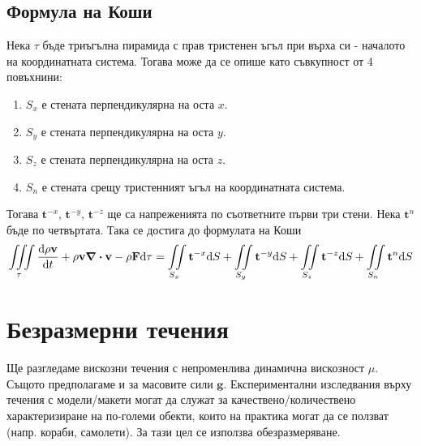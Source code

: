 \documentclass[bulgarian, 12pt]{article}
\begin{document}
\subsection{Формула на Коши}
Нека $\tau$ бъде триъгълна пирамида с прав тристенен ъгъл при върха си - началото на координатната система.
Тогава може да се опише като съвкупност от 4 повъхнини:
\begin{enumerate}
	\item $S_x$ е стената перпендикулярна на оста $x$.
	\item $S_y$ е стената перпендикулярна на оста $y$.
	\item $S_z$ е стената перпендикулярна на оста $z$.
	\item $S_n$ е стената срещу тристенният ъгъл на координатната система.
\end{enumerate}
Тогава $\mathbf{t}^{-x}$, $\mathbf{t}^{-y}$, $\mathbf{t}^{-z}$ ще са напреженията по съответните първи три стени.
Нека $\mathbf{t}^{n}$ бъде по четвъртата. Така се достига до формулата на Коши
\begin{equation}
	\iiint\limits_{\tau} \dv{\rho \mathbf{v}}{t} + \rho \mathbf{v} \div \mathbf{v} - \rho \mathbf{F} \dd \tau =
	\iint\limits_{S_x} \mathbf{t}^{-x} \dd S + \iint\limits_{S_y} \mathbf{t}^{-y} \dd S + \iint\limits_{S_z} \mathbf{t}^{-z} \dd S + \iint\limits_{S_n} \mathbf{t}^{n} \dd S
\end{equation}


\section{Безразмерни течения}
Ще разгледаме вискозни течения с непроменлива динамична вискозност $\mu$.
Същото предполагаме и за масовите сили $\mathbf{g}$.
Експериментални изследвания върху течения с модели/макети могат да служат за качествено/количествено характеризиране на по-големи обекти, които на практика могат да се ползват (напр. кораби, самолети).
За тази цел се използва обезразмеряване.
\end{document}
